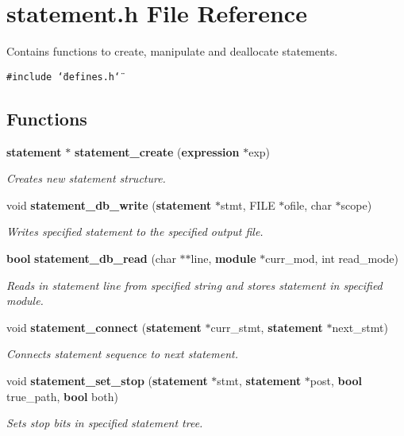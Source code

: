 \section{statement.h File Reference}
\label{statement_8h}
Contains functions to create, manipulate and deallocate statements. 


{\tt \#include \char`\"{}defines.h\char`\"{}}\par
\subsection*{Functions}
\begin{CompactItemize}
\item 
{\bf statement} $\ast$ {\bf statement\_\-create} ({\bf expression} $\ast$exp)
\begin{CompactList}\small\item\em Creates new statement structure.\item\end{CompactList}\item 
void {\bf statement\_\-db\_\-write} ({\bf statement} $\ast$stmt, FILE $\ast$ofile, char $\ast$scope)
\begin{CompactList}\small\item\em Writes specified statement to the specified output file.\item\end{CompactList}\item 
{\bf bool} {\bf statement\_\-db\_\-read} (char $\ast$$\ast$line, {\bf module} $\ast$curr\_\-mod, int read\_\-mode)
\begin{CompactList}\small\item\em Reads in statement line from specified string and stores statement in specified module.\item\end{CompactList}\item 
void {\bf statement\_\-connect} ({\bf statement} $\ast$curr\_\-stmt, {\bf statement} $\ast$next\_\-stmt)
\begin{CompactList}\small\item\em Connects statement sequence to next statement.\item\end{CompactList}\item 
void {\bf statement\_\-set\_\-stop} ({\bf statement} $\ast$stmt, {\bf statement} $\ast$post, {\bf bool} true\_\-path, {\bf bool} both)
\begin{CompactList}\small\item\em Sets stop bits in specified statement tree.\item\end{CompactList}\item 
$$
\end{CompactItemize}
